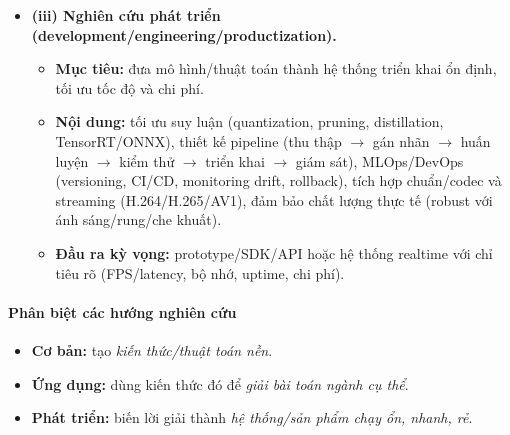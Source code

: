 \begin{itemize}
  \item \textbf{(iii) Nghiên cứu phát triển (development/engineering/productization).}
  \begin{itemize}
    \item \textbf{Mục tiêu:} đưa mô hình/thuật toán thành hệ thống triển khai ổn định, tối ưu tốc độ và chi phí.
    \item \textbf{Nội dung:} tối ưu suy luận (quantization, pruning, distillation, TensorRT/ONNX), thiết kế pipeline
    (thu thập $\rightarrow$ gán nhãn $\rightarrow$ huấn luyện $\rightarrow$ kiểm thử $\rightarrow$ triển khai $\rightarrow$ giám sát),
    MLOps/DevOps (versioning, CI/CD, monitoring drift, rollback), tích hợp chuẩn/codec và streaming (H.264/H.265/AV1),
    đảm bảo chất lượng thực tế (robust với ánh sáng/rung/che khuất).
    \item \textbf{Đầu ra kỳ vọng:} prototype/SDK/API hoặc hệ thống realtime với chỉ tiêu rõ (FPS/latency, bộ nhớ, uptime, chi phí).
  \end{itemize}
\end{itemize}


\paragraph{Phân biệt các hướng nghiên cứu}
\begin{itemize}
  \item \textbf{Cơ bản:} tạo \emph{kiến thức/thuật toán nền}.
  \item \textbf{Ứng dụng:} dùng kiến thức đó để \emph{giải bài toán ngành cụ thể}.
  \item \textbf{Phát triển:} biến lời giải thành \emph{hệ thống/sản phẩm chạy ổn, nhanh, rẻ}.
\end{itemize}

